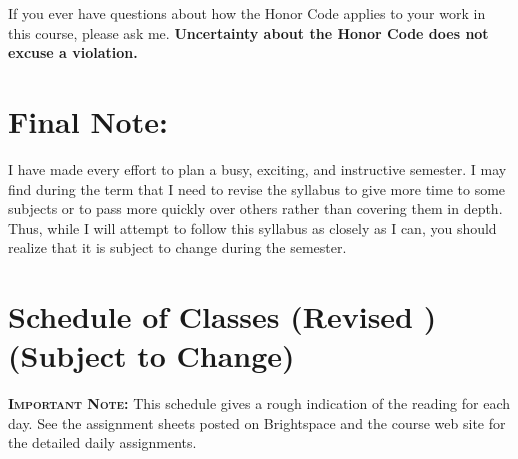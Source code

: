 \documentclass[11pt,twoside]{jgsyllabus}\usepackage[]{graphicx}\usepackage[]{xcolor}
\begin{document}
If you ever
have questions about how the Honor Code applies to your work
in this course, please ask me.
\textbf{Uncertainty about the Honor Code does not excuse a violation.}
\section{Final Note:}
I have made every effort to plan a busy, exciting, and instructive semester.
I may find during the term that I need to revise the syllabus to give more time
to some subjects or to pass more quickly over others rather than covering them
in depth.
Thus, while I will attempt to follow this syllabus as closely as I can,
you should realize that it is subject to change during the semester.
%
%
\iftrue

\fi
%
%
%
%
%
%
%

\clearpage
\appendix
\setcounter{secnumdepth}{0}
\newcommand{\maybehline}{\hline}%
\setlength\extrarowheight{4pt}
\section[Class Schedule]{Schedule of Classes
\ifrevised
	(Revised \RevisionDate)%
\else
	(Subject to Change)%
\fi}

\textbf{\scshape Important Note:} This schedule gives a rough indication of the
reading for each day. See the assignment sheets posted on Brightspace
and the course web site for the detailed daily assignments.
\end{document}
